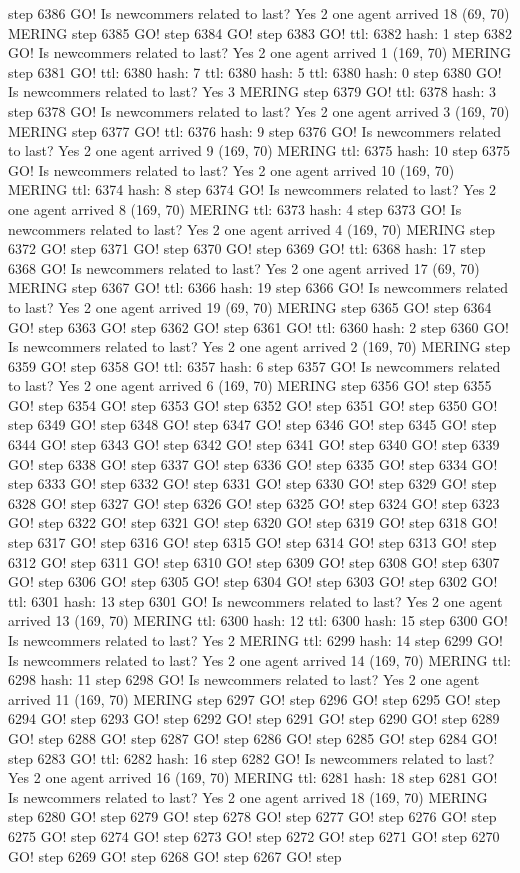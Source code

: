 step 6386 GO! Is newcommers related to last? Yes 2 one agent arrived 18 (69, 70) MERING step 6385 GO! step 6384 GO! step 6383 GO! ttl: 6382 hash: 1 step 6382 GO! Is newcommers related to last? Yes 2 one agent arrived 1 (169, 70) MERING step 6381 GO! ttl: 6380 hash: 7 ttl: 6380 hash: 5 ttl: 6380 hash: 0 step 6380 GO! Is newcommers related to last? Yes 3 MERING step 6379 GO! ttl: 6378 hash: 3 step 6378 GO! Is newcommers related to last? Yes 2 one agent arrived 3 (169, 70) MERING step 6377 GO! ttl: 6376 hash: 9 step 6376 GO! Is newcommers related to last? Yes 2 one agent arrived 9 (169, 70) MERING ttl: 6375 hash: 10 step 6375 GO! Is newcommers related to last? Yes 2 one agent arrived 10 (169, 70) MERING ttl: 6374 hash: 8 step 6374 GO! Is newcommers related to last? Yes 2 one agent arrived 8 (169, 70) MERING ttl: 6373 hash: 4 step 6373 GO! Is newcommers related to last? Yes 2 one agent arrived 4 (169, 70) MERING step 6372 GO! step 6371 GO! step 6370 GO! step 6369 GO! ttl: 6368 hash: 17 step 6368 GO! Is newcommers related to last? Yes 2 one agent arrived 17 (69, 70) MERING step 6367 GO! ttl: 6366 hash: 19 step 6366 GO! Is newcommers related to last? Yes 2 one agent arrived 19 (69, 70) MERING step 6365 GO! step 6364 GO! step 6363 GO! step 6362 GO! step 6361 GO! ttl: 6360 hash: 2 step 6360 GO! Is newcommers related to last? Yes 2 one agent arrived 2 (169, 70) MERING step 6359 GO! step 6358 GO! ttl: 6357 hash: 6 step 6357 GO! Is newcommers related to last? Yes 2 one agent arrived 6 (169, 70) MERING step 6356 GO! step 6355 GO! step 6354 GO! step 6353 GO! step 6352 GO! step 6351 GO! step 6350 GO! step 6349 GO! step 6348 GO! step 6347 GO! step 6346 GO! step 6345 GO! step 6344 GO! step 6343 GO! step 6342 GO! step 6341 GO! step 6340 GO! step 6339 GO! step 6338 GO! step 6337 GO! step 6336 GO! step 6335 GO! step 6334 GO! step 6333 GO! step 6332 GO! step 6331 GO! step 6330 GO! step 6329 GO! step 6328 GO! step 6327 GO! step 6326 GO! step 6325 GO! step 6324 GO! step 6323 GO! step 6322 GO! step 6321 GO! step 6320 GO! step 6319 GO! step 6318 GO! step 6317 GO! step 6316 GO! step 6315 GO! step 6314 GO! step 6313 GO! step 6312 GO! step 6311 GO! step 6310 GO! step 6309 GO! step 6308 GO! step 6307 GO! step 6306 GO! step 6305 GO! step 6304 GO! step 6303 GO! step 6302 GO! ttl: 6301 hash: 13 step 6301 GO! Is newcommers related to last? Yes 2 one agent arrived 13 (169, 70) MERING ttl: 6300 hash: 12 ttl: 6300 hash: 15 step 6300 GO! Is newcommers related to last? Yes 2 MERING ttl: 6299 hash: 14 step 6299 GO! Is newcommers related to last? Yes 2 one agent arrived 14 (169, 70) MERING ttl: 6298 hash: 11 step 6298 GO! Is newcommers related to last? Yes 2 one agent arrived 11 (169, 70) MERING step 6297 GO! step 6296 GO! step 6295 GO! step 6294 GO! step 6293 GO! step 6292 GO! step 6291 GO! step 6290 GO! step 6289 GO! step 6288 GO! step 6287 GO! step 6286 GO! step 6285 GO! step 6284 GO! step 6283 GO! ttl: 6282 hash: 16 step 6282 GO! Is newcommers related to last? Yes 2 one agent arrived 16 (169, 70) MERING ttl: 6281 hash: 18 step 6281 GO! Is newcommers related to last? Yes 2 one agent arrived 18 (169, 70) MERING step 6280 GO! step 6279 GO! step 6278 GO! step 6277 GO! step 6276 GO! step 6275 GO! step 6274 GO! step 6273 GO! step 6272 GO! step 6271 GO! step 6270 GO! step 6269 GO! step 6268 GO! step 6267 GO! step 